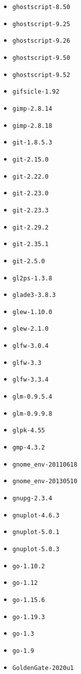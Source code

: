 \begin{itemize}
\item \verb|ghostscript-8.50|
\item \verb|ghostscript-9.25|
\item \verb|ghostscript-9.26|
\item \verb|ghostscript-9.50|
\item \verb|ghostscript-9.52|
\item \verb|gifsicle-1.92|
\item \verb|gimp-2.8.14|
\item \verb|gimp-2.8.18|
\item \verb|git-1.8.5.3|
\item \verb|git-2.15.0|
\item \verb|git-2.22.0|
\item \verb|git-2.23.0|
\item \verb|git-2.23.3|
\item \verb|git-2.29.2|
\item \verb|git-2.35.1|
\item \verb|git-2.5.0|
\item \verb|gl2ps-1.3.8|
\item \verb|glade3-3.8.3|
\item \verb|glew-1.10.0|
\item \verb|glew-2.1.0|
\item \verb|glfw-3.0.4|
\item \verb|glfw-3.3|
\item \verb|glfw-3.3.4|
\item \verb|glm-0.9.5.4|
\item \verb|glm-0.9.9.8|
\item \verb|glpk-4.55|
\item \verb|gmp-4.3.2|
\item \verb|gnome_env-20110618|
\item \verb|gnome_env-20130510|
\item \verb|gnupg-2.3.4|
\item \verb|gnuplot-4.6.3|
\item \verb|gnuplot-5.0.1|
\item \verb|gnuplot-5.0.3|
\item \verb|go-1.10.2|
\item \verb|go-1.12|
\item \verb|go-1.15.6|
\item \verb|go-1.19.3|
\item \verb|go-1.3|
\item \verb|go-1.9|
\item \verb|GoldenGate-2020u1|

\end{itemize}

